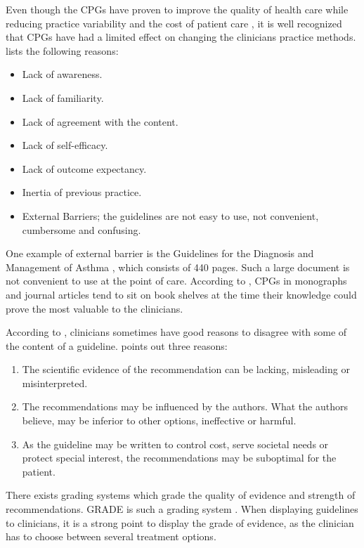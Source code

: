 Even though the CPGs have proven to improve the quality of health care while reducing practice variability and the cost of patient care \parencite{DeClercq2008}, it is well recognized that CPGs have had a limited effect on changing the clinicians practice methods. \textcite{Cabana1999} lists the following reasons:
\begin{itemize}
	\item Lack of awareness.
	\item Lack of familiarity.
	\item Lack of agreement with the content.
	\item Lack of self-efficacy.
	\item Lack of outcome expectancy.
	\item Inertia of previous practice. 
	\item External Barriers; the guidelines are not easy to use, not convenient, cumbersome and confusing.
\end{itemize}One example of external barrier is the Guidelines for the Diagnosis and Management of Asthma \parencite{NationalHeartLungandBloodInstitute2007}, which consists of 440 pages. Such a large document is not convenient to use at the point of care. According to \textcite{Shortliffe1998}, CPGs in monographs and journal articles tend to sit on book shelves at the time their knowledge could prove the most valuable to the clinicians. 

According to \textcite{Woolf1999}, clinicians sometimes have good reasons to disagree with some of the content of a guideline. \textcite{Woolf1999} points out three reasons:
\begin{enumerate}
	\item The scientific evidence of the recommendation can be lacking, misleading or misinterpreted.
	\item The recommendations may be influenced by the authors. What the authors believe, may be inferior to other options, ineffective or harmful.
	\item As the guideline may be written to control cost, serve societal needs or protect special interest, the recommendations may be suboptimal for the patient.
\end{enumerate}
There exists grading systems which grade the quality of evidence and strength of recommendations. GRADE is such a grading system \parencite{Guyatt2008}. When displaying guidelines to clinicians, it is a strong point to display the grade of evidence, as the clinician has to choose between several treatment options.


